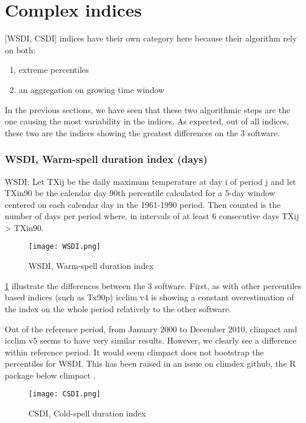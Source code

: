\documentclass[a4paper,11pt]{article}
\begin{document}
\part{Complex indices}
\label{part/complex_indices}
    [WSDI, CSDI] indices have their own category here because their algorithm rely on both:
    \begin{enumerate}
        \item extreme percentiles
        \item an aggregation on growing time window
    \end{enumerate}
    In the previous sections, we have seen that these two algorithmic steps are the one causing the most variability in the indices.
    As expected, out of all indices, these two are the indices showing the greatest differences on the 3 software.

    \section{WSDI, Warm-spell duration index (days)}
        WSDI: Let TXij be the daily maximum temperature at day i of period j and let
        TXin90 be the calendar day 90th percentile calculated for a 5-day window centered on each calendar day in the 1961-1990 period.
        Then counted is the number of days per period where, in intervals of at least 6 consecutive days TXij > TXin90.

        \begin{figure}[!hbt]
            \centering
            \texttt{[image: WSDI.png]}
            \caption{WSDI, Warm-spell duration index}
            \label{figure/wsdi}
        \end{figure}
        
        \ref{figure/wsdi} illustrate the differences between the 3 software.
        First, as with other percentiles based indices (such as Tx90p) icclim v4 is showing a constant overestimation of the index on the whole period relatively to the other software.

        Out of the reference period, from January 2000 to December 2010, climpact and icclim v5 seems to have very similar results.
        However, we clearly see a difference within reference period. It would seem climpact does not bootstrap the percentiles for WSDI.
        This has been raised in an issue on climdex github, the R package below climpact \cite{gh/wsdi_issue}.
    
        \begin{figure}[!hbt]
            \centering
            \texttt{[image: CSDI.png]}
            \caption{CSDI, Cold-spell duration index}
            \label{figure/csdi}
        \end{figure}
\end{document}
